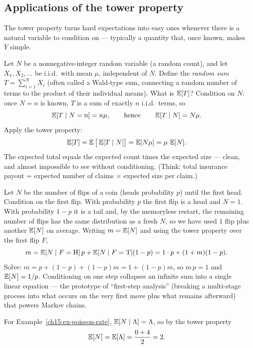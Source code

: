 \subsection{Applications of the tower property}
The tower property turns hard expectations into easy ones whenever there is a natural variable to
condition on --- typically a quantity that, once known, makes $Y$ simple.

\begin{example}
\label{ch15:ex-random-sum}
Let $N$ be a nonnegative-integer random variable (a random count), and let $X_1, X_2, \dots$ be i.i.d.\
with mean $\mu$, independent of $N$. Define the \emph{random sum} $T = \sum_{i=1}^{N} X_i$
(often called a Wald-type sum, connecting a random number of terms to the product of their individual means).
What is $\operatorname{\mathbb{E}}[T]$? Condition on $N$: once $N = n$ is known, $T$ is a sum of exactly $n$ i.i.d.\ terms, so
\[
  \operatorname{\mathbb{E}}[T \mid N = n] = n\mu, \qquad\text{hence}\qquad \operatorname{\mathbb{E}}[T\mid N] = N\mu.
\]
Apply the tower property:
\[
  \operatorname{\mathbb{E}}[T] = \operatorname{\mathbb{E}}\big[\operatorname{\mathbb{E}}[T\mid N]\big] = \operatorname{\mathbb{E}}[N\mu] = \mu\,\operatorname{\mathbb{E}}[N].
\]
The expected total equals the expected count times the expected size --- clean, and almost impossible
to see without conditioning. (Think: total insurance payout = expected number of claims $\times$
expected size per claim.)
\end{example}

\begin{example}
\label{ch15:ex-geom}
Let $N$ be the number of flips of a coin (heads probability $p$) until the first head. Condition on the
first flip. With probability $p$ the first flip is a head and $N = 1$. With probability $1-p$ it is a
tail and, by the memoryless restart, the remaining number of flips has the same distribution as a fresh
$N$, so we have used $1$ flip plus another $\operatorname{\mathbb{E}}[N]$ on average. Writing $m = \operatorname{\mathbb{E}}[N]$ and using the tower
property over the first flip $F$,
\[
  m = \operatorname{\mathbb{E}}[N\mid F=\text{H}]\,p + \operatorname{\mathbb{E}}[N\mid F=\text{T}](1-p)
    = 1\cdot p + (1 + m)(1-p).
\]
Solve: $m = p + (1-p) + (1-p)m = 1 + (1-p)m$, so $m\,p = 1$ and $\operatorname{\mathbb{E}}[N] = 1/p$. Conditioning on one step
collapses an infinite sum into a single linear equation --- the prototype of ``first-step analysis''
(breaking a multi-stage process into what occurs on the very first move plus what remains afterward)
that powers Markov chains.
\end{example}

\begin{example}
For Example~\ref{ch15:ex-poisson-rate}, $\operatorname{\mathbb{E}}[N\mid \Lambda] = \Lambda$, so by the tower property
\[
  \operatorname{\mathbb{E}}[N] = \operatorname{\mathbb{E}}[\Lambda] = \frac{0+4}{2} = 2.
\]
\end{example}

